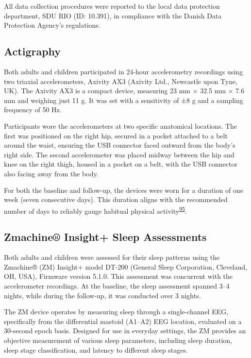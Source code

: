 \documentclass[
  9pt,
]{scrbook}
\begin{document}
All data collection procedures were reported to the local data
protection department, SDU RIO (ID: 10.391), in compliance with the
Danish Data Protection Agency's regulations.

\hypertarget{actigraphy}{%
\subsection{Actigraphy}\label{actigraphy}}

Both adults and children participated in 24-hour accelerometry
recordings using two triaxial accelerometers, Axivity AX3 (Axivity Ltd.,
Newcastle upon Tyne, UK). The Axivity AX3 is a compact device, measuring
23 mm × 32.5 mm × 7.6 mm and weighing just 11 g. It was set with a
sensitivity of ±8 g and a sampling frequency of 50 Hz.

Participants wore the accelerometers at two specific anatomical
locations. The first was positioned on the right hip, secured in a
pocket attached to a belt around the waist, ensuring the USB connector
faced outward from the body's right side. The second accelerometer was
placed midway between the hip and knee on the right thigh, housed in a
pocket on a belt, with the USB connector also facing away from the body.

For both the baseline and follow-up, the devices were worn for a
duration of one week (seven consecutive days). This duration aligns with
the recommended number of days to reliably gauge habitual physical
activity\textsuperscript{\protect\hyperlink{ref-jaeschke_variability_2018}{95}}.

\hypertarget{zmachine-insight-sleep-assessments}{%
\subsection{Zmachine® Insight+ Sleep
Assessments}\label{zmachine-insight-sleep-assessments}}

Both adults and children were assessed for their sleep patterns using
the Zmachine® (ZM) Insight+ model DT-200 (General Sleep Corporation,
Cleveland, OH, USA), Firmware version 5.1.0. This assessment was
concurrent with the accelerometer recordings. At the baseline, the sleep
assessment spanned 3--4 nights, while during the follow-up, it was
conducted over 3 nights.

The ZM device operates by measuring sleep through a single-channel EEG,
specifically from the differential mastoid (A1--A2) EEG location,
evaluated on a 30-second epoch basis. Designed for use in everyday
settings, the ZM provides an objective measurement of various sleep
parameters, including sleep duration, sleep stage classification, and
latency to different sleep stages.
\end{document}
